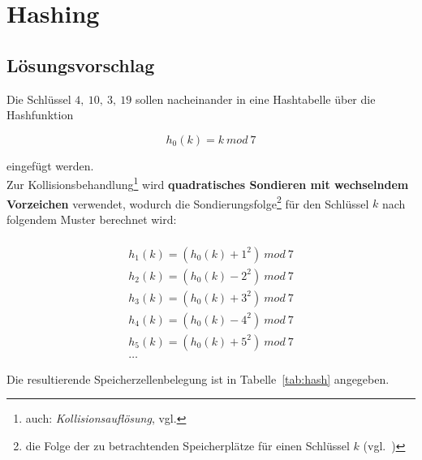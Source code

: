 \chapter{Hashing}

\section{Lösungsvorschlag}

Die Schlüssel $4,\ 10,\ 3,\ 19$ sollen nacheinander in eine Hashtabelle über die Hashfunktion

\begin{equation}
    h_0(k) = k\ mod\ 7
    \label{eq:hash}
\end{equation}

\noindent
eingefügt werden.\\

\noindent
Zur Kollisionsbehandlung\footnote{auch: \textit{Kollisionsauflösung}, vgl.\cite[Abschnitt 4.2 und 4.3]{OW17d}} wird \textbf{quadratisches Sondieren mit wechselndem Vorzeichen} verwendet, wodurch die Sondierungsfolge\footnote{
die Folge der zu betrachtenden Speicherplätze für einen Schlüssel $k$ (vgl.~\cite[203]{OW17d})
} für den Schlüssel $k$ nach folgendem Muster berechnet wird:

\begin{align}

    \\
    h_1(k) = (h_0(k) + 1^2)\ mod\  7 \\

    h_2(k) = (h_0(k) - 2^2)\ mod\  7 \\

    h_3(k) = (h_0(k) + 3^2)\ mod\  7 \\

    h_4(k) = (h_0(k) - 4^2)\ mod\  7 \\

    h_5(k) = (h_0(k) + 5^2)\ mod\  7 \\

    \ldots
\end{align}

Die resultierende Speicherzellenbelegung ist in Tabelle~\ref{tab:hash} angegeben.

